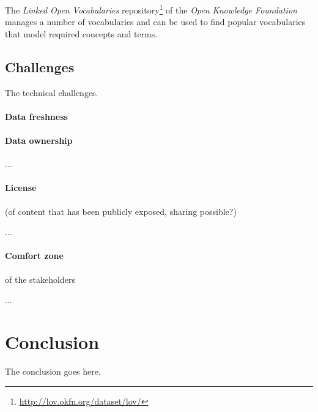 \documentclass{article}
\begin{document}
The \textit{Linked Open Vocabularies} repository\footnote{\url{http://lov.okfn.org/dataset/lov/}} of the \textit{Open Knowledge Foundation} manages a number of vocabularies and can be used to find popular vocabularies that model required concepts and terms.

\subsection{Challenges}
\label{technical-architecture-challenges:challenges}

The technical challenges. 

\paragraph{Data freshness}
\label{technical-architecture-challenges:challenges:data-freshness}

\paragraph{Data ownership}
\label{technical-architecture-challenges:challenges:data-ownership}

...

\paragraph{License} (of content that has been publicly exposed, sharing possible?)
\label{technical-architecture-challenges:challenges:license}

...

\paragraph{Comfort zone} of the stakeholders
\label{technical-architecture-challenges:challenges:comfort-zone}

...


\section{Conclusion}
\label{conclusion}
The conclusion goes here.

 
\end{document}
